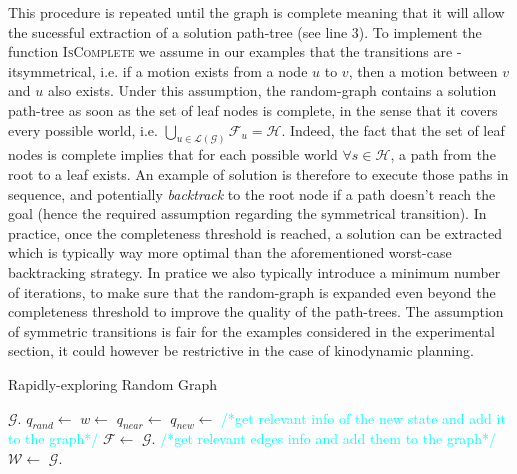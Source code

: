 \documentclass[letterpaper, 10 pt, conference]{ieeeconf}  %
\begin{document}
This procedure is repeated until the graph is complete meaning that it will allow the sucessful extraction of a solution path-tree (see line 3). To implement the function \textsc{IsComplete} we assume in our examples that the transitions are \text-it{symmetrical}, i.e. if a motion exists from a node $u$ to $v$, then a motion between $v$ and $u$ also exists. Under this assumption, the random-graph contains a solution path-tree as soon as the set of leaf nodes is complete, in the sense that it covers every possible world, i.e.  $\bigcup_{u \in \mathcal{\mathcal{L}(G)}} \mathcal{F}_u = \mathcal{H}$. Indeed, the fact that the set of leaf nodes is complete implies that for each possible world $\forall s \in \mathcal{H}$, a path from the root to a leaf exists. An example of solution is therefore to execute those paths in sequence, and  potentially \textit{backtrack} to the root node if a path doesn't reach the goal (hence the required assumption regarding the symmetrical transition). In practice, once the completeness threshold is reached, a solution can be extracted which is typically way more optimal than the aforementioned worst-case backtracking strategy. In pratice we also typically introduce a minimum number of iterations, to make sure that the random-graph is expanded even beyond the completeness threshold to improve the quality of the path-trees. The assumption of symmetric transitions is fair for the examples considered in the experimental section, it could however be restrictive in the case of kinodynamic planning. %

\begin{algorithm}[H]
\caption{Rapidly-exploring Random Graph}
\label{alg:rrg}
\begin{algorithmic}[1]
	\State $\mathcal{G}$.
    	\State $q_{rand} \gets$ 
    	\State $w \gets$ 
    	\State $q_{near} \gets$ 
    	\State $q_{new} \gets$ 
    	\State \textcolor{cyan}{\footnotesize/*get relevant info of the new state and add it to the graph*/}
    	    \State $\mathcal{F} \gets$ 
    		\State $\mathcal{G}$.
    		\State \textcolor{cyan}{\footnotesize/*get relevant edges info and add them to the graph*/}
    			\State $\mathcal{W} \gets$ 
    				\State $\mathcal{G}$.
    			\EndIf
    		\EndFor
    	\EndIf
    \EndWhile
\EndFunction
\Statex
\end{algorithmic}
\end{algorithm}
\end{document}
